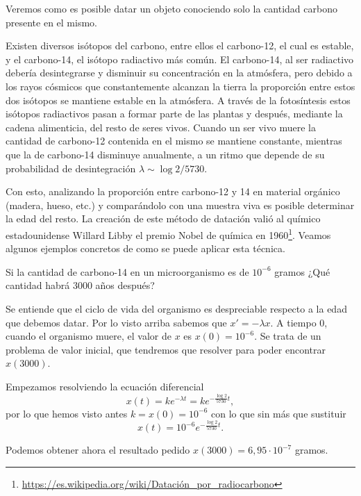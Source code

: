 \documentclass[../ecuaciones_diferenciales.tex]{subfiles}
\begin{document}
Veremos como es posible datar un objeto conociendo solo la cantidad carbono 
presente en el mismo.

Existen diversos isótopos del carbono, entre ellos el carbono-12, el cual es
estable, y el carbono-14, el isótopo radiactivo más común. El carbono-14, al ser
radiactivo debería desintegrarse y disminuir su concentración en la atmósfera,
pero debido a los rayos cósmicos que constantemente alcanzan la tierra la
proporción entre estos dos isótopos se mantiene estable en la atmósfera. A
través de la fotosíntesis estos isótopos radiactivos pasan a formar parte de las
plantas y después, mediante la cadena alimenticia, del resto de seres vivos.
Cuando un ser vivo muere la cantidad de carbono-12 contenida en el mismo se
mantiene constante, mientras que la de carbono-14 disminuye anualmente,
a un ritmo que depende de su probabilidad de desintegración
\(\lambda \sim \log 2 / 5730\).

Con esto, analizando la proporción entre carbono-12 y 14 en
material orgánico (madera, hueso, etc.) y comparándolo con una muestra viva es 
posible determinar la edad del resto. La creación de este método de
datación valió al químico estadounidense Willard Libby el premio Nobel de
química en
1960\footnote{\url{https://es.wikipedia.org/wiki/Datación_por_radiocarbono}}.
Veamos algunos ejemplos concretos de como se puede aplicar esta
técnica.

\begin{example}
	Si la cantidad de carbono-14 en un microorganismo es de \(10^{-6}\) gramos
	¿Qué cantidad habrá 3000 años después?
\end{example}

\begin{solution}
	Se entiende que el ciclo de vida del organismo es despreciable respecto a la
	edad que debemos datar. Por lo visto arriba sabemos que \(x' = -\lambda x\).
	A tiempo \(0\), cuando el organismo muere, el valor de \(x\) es
	\(x(0) = 10^{-6}\). Se trata de un problema de valor inicial, que tendremos
	que resolver para poder encontrar \(x(3000)\). 

	Empezamos resolviendo la ecuación diferencial
	\[x(t) = k e^{-\lambda t} = k e^{-\frac{\log 2}{5730} t},\]
	por lo que hemos visto antes \(k = x(0) = 10^{-6}\) con lo que sin más que
	sustituir
	\[x(t) = 10^{-6} e^{-\frac{\log 2}{5730} t}.\]

	Podemos obtener ahora el resultado pedido 
	\(x(3000) = 6,95 \cdot 10^{-7}\) gramos.
\end{solution}
\end{document}
